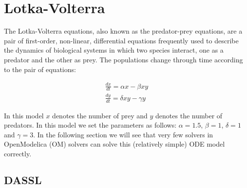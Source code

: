\documentclass[10pt]{article}
\begin{document}
\newcommand{\bottomline}{\arrayrulecolor{white}\specialrule{\aboverulesep}{0pt}{0pt}%
	\arrayrulecolor{black}\specialrule{\heavyrulewidth}{0pt}{\belowbottomsep}}%

\newcommand{\bottomlinec}{\arrayrulecolor{tablerowcolor}\specialrule{\aboverulesep}{0pt}{0pt}%
	\arrayrulecolor{black}\specialrule{\heavyrulewidth}{0pt}{\belowbottomsep}}%

\newcommand{\bottomlinect}{\arrayrulecolor{tableheadcolor}\specialrule{\aboverulesep}{0pt}{0pt}%
	\arrayrulecolor{black}\specialrule{\heavyrulewidth}{0pt}{\belowbottomsep}}%



\maketitle



\pagestyle{myheadings}


\section{Lotka-Volterra}

The Lotka-Volterra equations, also known as the predator-prey equations, are a pair of first-order, non-linear, differential equations frequently used to describe the dynamics of biological systems in which two species interact, one as a predator and the other as prey. The populations change through time according to the pair of equations:

\begin{align*}
\frac{dx}{dt}  = \alpha x - \beta x y \\[6pt]
\frac{dy}{dt}  = \delta x y  - \gamma y
\end{align*}

In this model $x$ denotes the number of prey and $y$ denotes the number of predators. In this model we set the parameters as follows: $\alpha = 1.5$, $\beta = 1$, $\delta =1$ and $\gamma=3$. In the following section we will see that very few solvers in OpenModelica (OM) solvers can solve this (relatively simple) ODE model correctly.

\subsection{DASSL}
\end{document}
